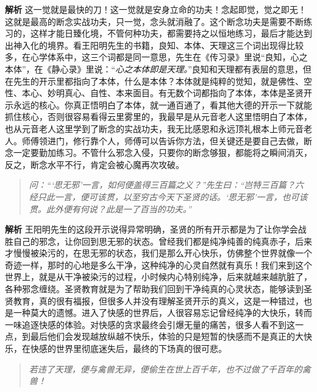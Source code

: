 \textbf{解析} 这一觉就是最快的刀！这一觉就是安身立命的功夫！念起即觉，觉之即无！这就是最高的断念实战功夫，只一觉，念头就消融了。这个断念功夫是需要不断练习的，这样才能日臻化境，不管何种功夫，都需要持之以恒地练习，最后才能达到出神入化的境界。看王阳明先生的书籍，良知、本体、天理这三个词出现得比较多，在心学体系中，这三个词都是同一意思，先生在《传习录》里说“良知，心之本体”，在《静心录》里说：“\textit{心之本体即是天理。}”良知和天理都有表层的意思，但在先生的开示里都指向了本体，什么是本体？本体就是纯粹的觉知，就是佛性、空性、本心、妙明真心、自性、本来面目。有无数个词都指向了本体，本体是圣贤开示永远的核心。你真正悟明白了本体，就一通百通了，看其他大德的开示一下就能抓住核心，否则很容易看得云里雾里的，我最早是从元音老人这里悟明白了本体，也从元音老人这里学到了断念的实战功夫，我无比感恩和永远顶礼根本上师元音老人。师傅领进门，修行靠个人，师傅可以告诉你方法，但关键还是要自己去做，断念一定要勤加练习。不管什么邪念入侵，只要你的断念够狠，都能将之瞬间消灭，反之，断念水平不行，肯定会被心魔再次攻破。

\begin{quote}\it
    问：“‘思无邪’一言，如何便盖得三百篇之义？”先生曰：“岂特三百篇？六经只此一言，便可该贯，以至穷古今天下圣贤的话。‘思无邪’一言，也可该贯。此外便有何说？此是一了百当的功夫。”
\end{quote}

\textbf{解析} 王阳明先生的这段开示说得异常明确，圣贤的所有开示都是为了让你学会战胜自己的邪念，让你回到思无邪的状态。曾经我们都是纯净纯善的纯真赤子，后来才慢慢被染污的，在思无邪的状态，我们是那么开心快乐，仿佛整个世界就像一个奇迹一样，那时的心地是多么干净，这种纯净的心灵自然就有真乐！我们来到这个世界上，就是从干净被染污的过程，小时候内心特别纯净，后来就越来越肮脏了，各种邪念缠绕。圣贤教育就是为了帮助我们回到干净纯真的心灵状态，能够读到圣贤教育，真的很有福报，但很多人并没有理解圣贤开示的真义，这是一种错过，也是一种莫大的遗憾。进入了快感的世界后，人很容易忘记曾经纯净的大快乐，转而一味追逐快感的体验。对快感的贪求最终会引爆无量的痛苦，很多人看不到这一点，到最后他们会发现越放纵越不快乐，体验的只是短暂的快感而不是真正的大快乐，在快感的世界里彻底迷失后，最终的下场真的很可悲。

\begin{quote}\it
    若违了天理，便与禽兽无异，便偷生在世上百千年，也不过做了千百年的禽兽！
\end{quote}

